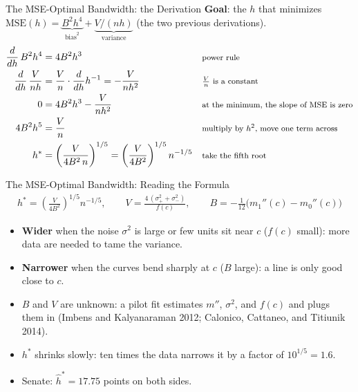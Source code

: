 \documentclass[aspectratio=169,11pt,xcolor=dvipsnames]{beamer}
\newcommand{\srcp}[1]{{\scriptsize\color{gray}(#1)}}
\begin{document}
\begin{frame}{The MSE-Optimal Bandwidth: the Derivation}
\textbf{Goal}: the $h$ that minimizes
$\text{MSE}(h) = \underbrace{B^2 h^4}_{\text{bias}^2} + \underbrace{V/(nh)}_{\text{variance}}$
(the two previous derivations).
\begin{align*}
  \frac{d}{dh}\,B^2h^4 &= 4B^2h^3
   && \text{\footnotesize power rule} \\
  \frac{d}{dh}\,\frac{V}{nh} &= \frac{V}{n}\cdot\frac{d}{dh}h^{-1} = -\frac{V}{nh^2}
   && \text{\footnotesize $\tfrac{V}{n}$ is a constant} \\
  0 &= 4B^2h^3 - \frac{V}{nh^2}
   && \text{\footnotesize at the minimum, the slope of MSE is zero} \\
  4B^2h^5 &= \frac{V}{n}
   && \text{\footnotesize multiply by $h^2$, move one term across} \\
  h^{*} &= \left(\frac{V}{4B^2\,n}\right)^{1/5} = \left(\frac{V}{4B^2}\right)^{1/5} n^{-1/5}
   && \text{\footnotesize take the fifth root}
\end{align*}
\end{frame}

\begin{frame}{The MSE-Optimal Bandwidth: Reading the Formula}
\begin{align*}
  h^{*} = \left(\frac{V}{4B^2}\right)^{1/5} n^{-1/5},
  \qquad V = \frac{4\,(\sigma_+^2 + \sigma_-^2)}{f(c)},
  \qquad B = -\tfrac1{12}\big(m_1''(c) - m_0''(c)\big)
\end{align*}
\begin{itemize}\itemsep4pt
  \item \textbf{Wider} when the noise $\sigma^2$ is large or few units sit near $c$
        ($f(c)$ small): more data are needed to tame the variance.
  \item \textbf{Narrower} when the curves bend sharply at $c$ ($B$ large): a line is
        only good close to $c$.
  \item $B$ and $V$ are unknown: a pilot fit estimates $m''$, $\sigma^2$, and
        $f(c)$ and plugs them in \srcp{Imbens and Kalyanaraman 2012; Calonico, Cattaneo, and Titiunik 2014}.
  \item $h^{*}$ shrinks slowly: ten times the data narrows it by a factor of
        $10^{1/5} = 1.6$.
  \item Senate: $\hat h^{*} = 17.75$ points on both sides.
\end{itemize}
\end{frame}
\end{document}
